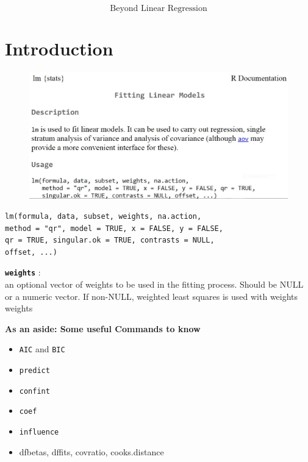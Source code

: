 \documentclass{beamer}
\begin{document}
\begin{frame}
	\LARGE
	\[\mbox{Beyond Linear Regression}\]
\end{frame}
\section{Introduction}
\begin{frame}
\begin{figure}
\centering
\includegraphics[width=1.1\linewidth]{images/LMhelpfile}
\end{figure}

\end{frame}
\begin{frame}[fragile]
\begin{framed}
	\begin{verbatim}
lm(formula, data, subset, weights, na.action,
method = "qr", model = TRUE, x = FALSE, y = FALSE, 
qr = TRUE, singular.ok = TRUE, contrasts = NULL, 
offset, ...)
	\end{verbatim}
\end{framed}

\textbf{ \texttt{weights}	} :\\ 
an optional vector of weights to be used in the fitting process. Should be NULL or a numeric vector. 
If non-NULL, weighted least squares is used with weights weights

\end{frame}
\begin{frame}
	\noindent \textbf{As an aside: Some useful Commands to know}
\Large


\begin{itemize}
\item \texttt{AIC} and \texttt{BIC}
\item \texttt{predict}
\item \texttt{confint}
\item \texttt{coef}
\item \texttt{influence}
\item dfbetas, dffits, covratio, cooks.distance
\end{itemize}
\end{frame}
\end{document}
